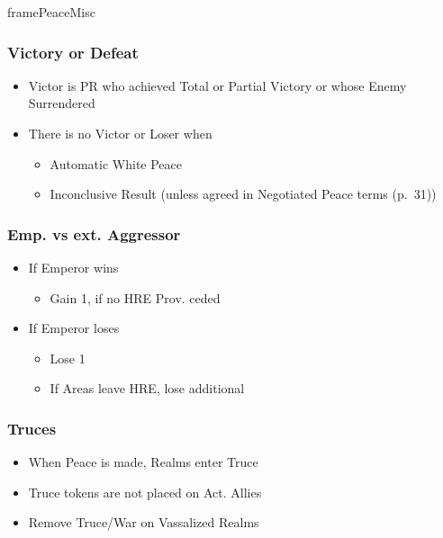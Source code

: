 \documentclass[10pt]{article}
\begin{document}
\begin{dynamiccontents*}{framePeaceMisc}
	\begin{multicols}{2}
		\subsubsection*{Victory or Defeat }
		\begin{itemize}
			\item Victor is PR who achieved Total or Partial Victory or whose Enemy Surrendered
			\item There is no Victor or Loser when
			\begin{itemize}
				\item Automatic White Peace
				\item Inconclusive Result (unless agreed in Negotiated Peace terms (p.~31))
			\end{itemize}
		\end{itemize}

			\columnbreak
		\subsubsection*{Emp. vs ext. Aggressor }
		\begin{itemize}
			\item If Emperor wins
			\begin{itemize}
				\item Gain 1\authority, if no HRE Prov. ceded
			\end{itemize}
			\item If Emperor loses
			\begin{itemize}
				\item Lose 1\authority
				\item If Areas leave HRE, lose additional \authority
			\end{itemize}
		\end{itemize}

		\subsubsection*{Truces }
		\begin{itemize}
			\item When Peace is made, Realms enter Truce
			\item Truce tokens are not placed on Act. Allies
			\item Remove Truce/War on Vassalized Realms
		\end{itemize}
	\end{multicols}

\end{dynamiccontents*}%
\end{document}
